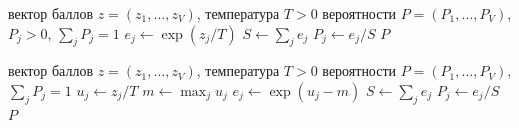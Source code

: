 \documentclass[a4paper,12pt]{article}
\begin{document}
\begin{algorithm}
\caption{Softmax с температурой}\label{alg:softmax}
\begin{algorithmic}[1]
\Require вектор баллов $z=(z_1,\dots,z_V)$, температура $T>0$
\Ensure вероятности $P=(P_1,\dots,P_V)$, $P_j>0$, $\sum_j P_j = 1$
        \State $e_j \gets \exp(z_j / T)$ 
    \EndFor
    \State $S \gets \sum_j e_j$ 
        \State $P_j \gets e_j / S$ 
    \EndFor
    \State \Return $P$
\EndFunction
\end{algorithmic}
\end{algorithm}

\begin{algorithm}
\caption{Softmax с вычитанием максимума (устойчивая версия)}\label{alg:softmax-stable}
\begin{algorithmic}[1]
\Require вектор баллов $z=(z_1,\dots,z_V)$, температура $T>0$
\Ensure вероятности $P=(P_1,\dots,P_V)$, $\sum_j P_j = 1$
        \State $u_j \gets z_j / T$ 
    \EndFor
    \State $m \gets \max_j u_j$ 
        \State $e_j \gets \exp(u_j - m)$ 
    \EndFor
    \State $S \gets \sum_j e_j$
        \State $P_j \gets e_j / S$
    \EndFor
    \State \Return $P$
\EndFunction
\end{algorithmic}
\end{algorithm}
\end{document}
